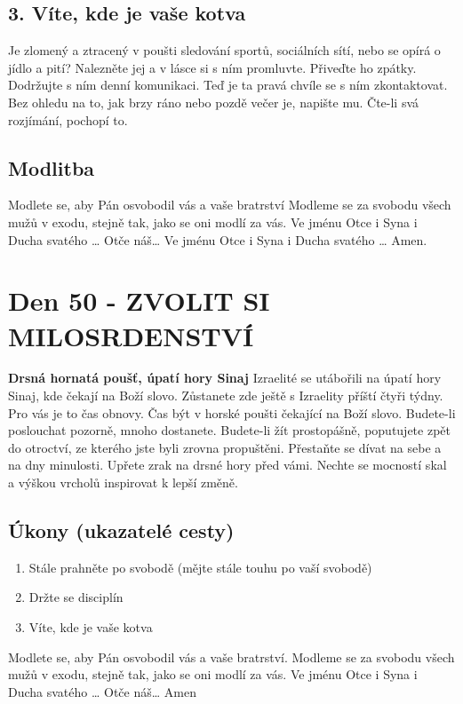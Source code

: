 \documentclass[11pt]{article}
\newcommand{\zacatekOsmyTyden}{
  \textbf{Drsná hornatá poušť, úpatí hory Sinaj} \newline 
  Izraelité se utábořili na úpatí hory Sinaj, kde čekají na Boží slovo. Zůstanete zde ještě s Izraelity příští čtyři týdny. Pro vás je to čas obnovy. Čas být v horské poušti čekající na Boží slovo. Budete-li poslouchat pozorně, mnoho dostanete. Budete-li žít prostopášně, poputujete zpět do otroctví, ze kterého jste byli zrovna propuštěni. Přestaňte se dívat na sebe a na dny minulosti. Upřete zrak na drsné hory před vámi. Nechte se mocností skal a výškou vrcholů inspirovat k lepší změně.
  \subsection*{Úkony (ukazatelé cesty)}
\begin{enumerate}
  \item Stále prahněte po svobodě (mějte stále touhu po vaší svobodě)
  \item Držte se disciplín
  \item Víte, kde je vaše kotva
\end{enumerate}
Modlete se, aby Pán osvobodil vás a vaše bratrství. \newline
Modleme se za svobodu všech mužů v exodu, stejně tak, jako se oni modlí za vás.\newline
Ve jménu Otce i Syna i Ducha svatého …  Otče náš… Amen
}
\begin{document}
\subsection*{3. Víte, kde je vaše kotva}
Je zlomený a ztracený v poušti sledování sportů, sociálních sítí, nebo se opírá o jídlo a pití? Nalezněte jej a v lásce si s ním promluvte. Přiveďte ho zpátky. Dodržujte s ním denní komunikaci. Teď je ta pravá chvíle se s ním zkontaktovat. Bez ohledu na to, jak brzy ráno nebo pozdě večer je, napište mu. Čte-li svá rozjímání, pochopí to.

\subsection*{Modlitba}
Modlete se, aby Pán osvobodil vás a vaše bratrství \newline
Modleme se za svobodu všech mužů v exodu, stejně tak, jako se oni modlí za vás.\newline
Ve jménu Otce i Syna i Ducha svatého … Otče náš… Ve jménu Otce i Syna i Ducha svatého … Amen.
\newpage


\newpage
\section{Den 50 - ZVOLIT SI MILOSRDENSTVÍ }
\zacatekOsmyTyden
\end{document}
